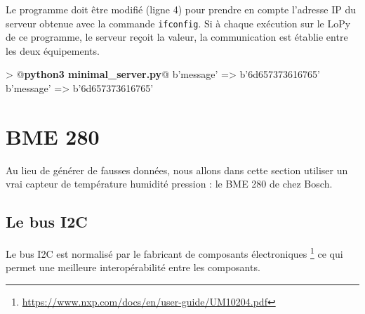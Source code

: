 
Le programme  doit être modifié (ligne 4) pour prendre en compte l'adresse IP du serveur obtenue avec la commande \texttt{ifconfig}. Si à chaque exécution sur le LoPy de ce programme, le serveur reçoit la valeur, la communication est établie entre les deux équipements.

\begin{termc}[backgroundcolor=\color{palerod}, language=json, basicstyle=\ttfamily\small, escapechar=@]
> @\textbf{python3 minimal\_server.py}@
b'message' => b'6d657373616765'
b'message' => b'6d657373616765'
\end{termc}


\section{BME 280}

\begin{figure}
\end{figure}

Au lieu de générer de fausses données, nous allons dans cette section utiliser un vrai capteur de température humidité pression : le BME 280 de chez Bosch. 


\subsection{Le bus I2C}

Le bus I2C est  normalisé par le fabricant de composants électroniques  \footnote{\url{https://www.nxp.com/docs/en/user-guide/UM10204.pdf}} ce qui permet une meilleure interopérabilité entre les composants.

